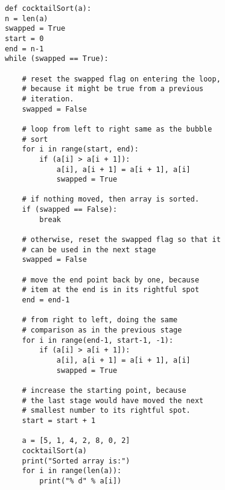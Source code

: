 \begin{verbatim}
            def cocktailSort(a):
            n = len(a)
            swapped = True
            start = 0
            end = n-1
            while (swapped == True):
         
                # reset the swapped flag on entering the loop,
                # because it might be true from a previous
                # iteration.
                swapped = False
         
                # loop from left to right same as the bubble
                # sort
                for i in range(start, end):
                    if (a[i] > a[i + 1]):
                        a[i], a[i + 1] = a[i + 1], a[i]
                        swapped = True
         
                # if nothing moved, then array is sorted.
                if (swapped == False):
                    break
         
                # otherwise, reset the swapped flag so that it
                # can be used in the next stage
                swapped = False
         
                # move the end point back by one, because
                # item at the end is in its rightful spot
                end = end-1
         
                # from right to left, doing the same
                # comparison as in the previous stage
                for i in range(end-1, start-1, -1):
                    if (a[i] > a[i + 1]):
                        a[i], a[i + 1] = a[i + 1], a[i]
                        swapped = True
         
                # increase the starting point, because
                # the last stage would have moved the next
                # smallest number to its rightful spot.
                start = start + 1
        
                a = [5, 1, 4, 2, 8, 0, 2]
                cocktailSort(a)
                print("Sorted array is:")
                for i in range(len(a)):
                    print("% d" % a[i])

\end{verbatim}\\








